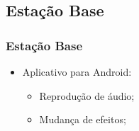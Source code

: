 \documentclass[hyperref={pdfpagelabels=false}]{beamer}
\begin{document}
            \subsection{Estação Base}

                \begin{frame}\frametitle{Estação Base}

                     \begin{itemize}
                      \item Aplicativo para Android:
                        \begin{itemize}
                          \item Reprodução de áudio;
                          \item Mudança de efeitos;
                        \end{itemize}
                    \end{itemize}


\end{frame}
\end{document}
